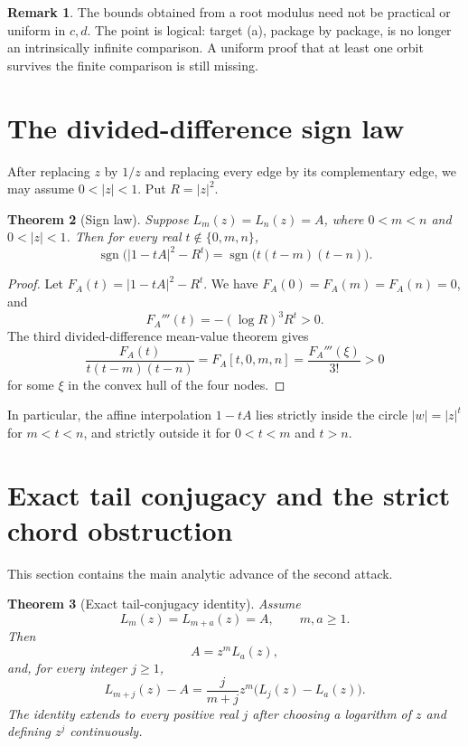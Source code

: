 \documentclass[11pt]{article}
\newtheorem{theorem}{Theorem}[section]
\theoremstyle{definition}
\newtheorem{remark}[theorem]{Remark}
\begin{document}
\begin{remark}
The bounds obtained from a root modulus need not be practical or uniform in
\(c,d\).  The point is logical: target (a), package by package, is no longer
an intrinsically infinite comparison.  A uniform proof that at least one
orbit survives the finite comparison is still missing.
\end{remark}

\section{The divided-difference sign law}

After replacing \(z\) by \(1/z\) and replacing every edge by its complementary
edge, we may assume \(0<|z|<1\).  Put \(R=|z|^2\).

\begin{theorem}[Sign law]\label{thm:sign}
Suppose \(L_m(z)=L_n(z)=A\), where \(0<m<n\) and \(0<|z|<1\).  Then for every
real \(t\notin\{0,m,n\}\),
\[
 \operatorname{sgn}\bigl(|1-tA|^2-R^t\bigr)
 =\operatorname{sgn}\bigl(t(t-m)(t-n)\bigr).
 \tag{5.1}
\]
\end{theorem}

\begin{proof}
Let \(F_A(t)=|1-tA|^2-R^t\).  We have
\(F_A(0)=F_A(m)=F_A(n)=0\), and
\[
 F_A'''(t)=-(\log R)^3R^t>0.
\]
The third divided-difference mean-value theorem gives
\[
 \frac{F_A(t)}{t(t-m)(t-n)}
 =F_A[t,0,m,n]=\frac{F_A'''(\xi)}{3!}>0
\]
for some \(\xi\) in the convex hull of the four nodes.
\end{proof}

In particular, the affine interpolation \(1-tA\) lies strictly inside the
circle \(|w|=|z|^t\) for \(m<t<n\), and strictly outside it for
\(0<t<m\) and \(t>n\).

\section{Exact tail conjugacy and the strict chord obstruction}
\label{sec:tail}

This section contains the main analytic advance of the second attack.

\begin{theorem}[Exact tail-conjugacy identity]\label{thm:tail}
Assume
\[
 L_m(z)=L_{m+a}(z)=A,
 \qquad m,a\geq1.
\]
Then
\begin{equation}
 A=z^mL_a(z),
 \tag{6.1}
\end{equation}
and, for every integer \(j\geq1\),
\begin{equation}
 L_{m+j}(z)-A
 =\frac{j}{m+j}z^m\bigl(L_j(z)-L_a(z)\bigr).
 \tag{6.2}
\end{equation}
The identity extends to every positive real \(j\) after choosing a logarithm
of \(z\) and defining \(z^j\) continuously.
\end{theorem}
\end{document}
